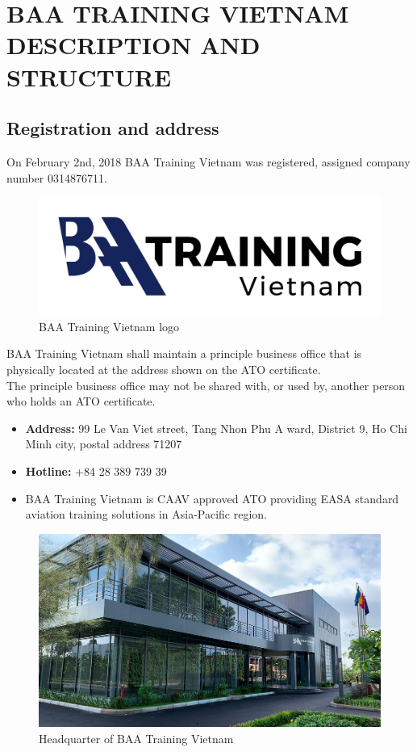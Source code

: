 \chapter{BAA TRAINING VIETNAM DESCRIPTION AND STRUCTURE}

\renewcommand{\headrulewidth}{0.5pt}
\renewcommand{\footrulewidth}{0.5pt}
\thispagestyle{plain}
\pagestyle{fancy}
\fancyhf{}
\raggedright
{}

\justifying

\section{Registration and address}
    On February 2nd, 2018 BAA Training Vietnam was registered, assigned company number 0314876711. \\
    \begin{figure}[H]
        \centering
        \includegraphics[width=0.6\linewidth]{img/company-logo.png}
        \caption{BAA Training Vietnam logo}
    \end{figure}
    BAA Training Vietnam shall maintain a principle business office that is physically located at the address shown on the ATO certificate. \\ 
    \vspace{3mm}
    The principle business office may not be shared with, or used by, another person who holds an ATO certificate.
    \begin{itemize}
        \item \textbf{Address:} 99 Le Van Viet street, Tang Nhon Phu A ward, District 9, Ho Chi Minh city, postal address 71207
        \item \textbf{Hotline:} +84 28 389 739 39
        \item BAA Training Vietnam is CAAV approved ATO providing EASA standard aviation training solutions in Asia-Pacific region.
    \end{itemize}
    \begin{figure}[H]
        \centering
        \includegraphics[width=0.6\linewidth]{img/company.jpg}
        \caption{Headquarter of BAA Training Vietnam}
    \end{figure}

